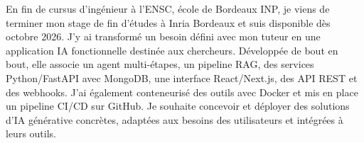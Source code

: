 
\begin{cvparagraph}
En fin de cursus d’ingénieur à l’ENSC, école de Bordeaux INP, je viens de terminer mon stage de fin d’études à Inria Bordeaux et suis disponible dès octobre 2026. J’y ai transformé un besoin défini avec mon tuteur en une application IA fonctionnelle destinée aux chercheurs. Développée de bout en bout, elle associe un agent multi-étapes, un pipeline RAG, des services Python/FastAPI avec MongoDB, une interface React/Next.js, des API REST et des webhooks. J’ai également conteneurisé des outils avec Docker et mis en place un pipeline CI/CD sur GitHub. Je souhaite concevoir et déployer des solutions d’IA générative concrètes, adaptées aux besoins des utilisateurs et intégrées à leurs outils.
\end{cvparagraph}
